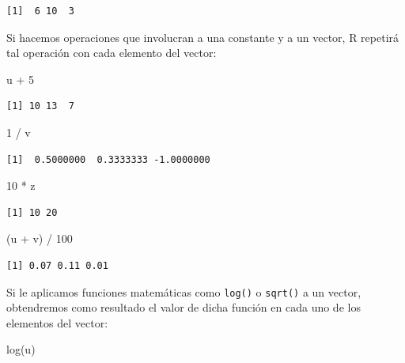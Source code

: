 \documentclass[
]{book}
\newenvironment{Shaded}{\begin{snugshade}}{\end{snugshade}}
\newcommand{\DecValTok}[1]{\textcolor[rgb]{0.00,0.00,0.81}{#1}}
\newcommand{\FunctionTok}[1]{\textcolor[rgb]{0.00,0.00,0.00}{#1}}
\newcommand{\NormalTok}[1]{#1}
\newcommand{\SpecialCharTok}[1]{\textcolor[rgb]{0.00,0.00,0.00}{#1}}
\begin{document}
\begin{verbatim}
[1]  6 10  3
\end{verbatim}

Si hacemos operaciones que involucran a una constante y a un vector, R repetirá tal operación con cada elemento del vector:

\begin{Shaded}
\begin{Highlighting}[]
\NormalTok{u }\SpecialCharTok{+} \DecValTok{5}
\end{Highlighting}
\end{Shaded}

\begin{verbatim}
[1] 10 13  7
\end{verbatim}

\begin{Shaded}
\begin{Highlighting}[]
\DecValTok{1} \SpecialCharTok{/}\NormalTok{ v}
\end{Highlighting}
\end{Shaded}

\begin{verbatim}
[1]  0.5000000  0.3333333 -1.0000000
\end{verbatim}

\begin{Shaded}
\begin{Highlighting}[]
\DecValTok{10} \SpecialCharTok{*}\NormalTok{ z}
\end{Highlighting}
\end{Shaded}

\begin{verbatim}
[1] 10 20
\end{verbatim}

\begin{Shaded}
\begin{Highlighting}[]
\NormalTok{(u }\SpecialCharTok{+}\NormalTok{ v) }\SpecialCharTok{/} \DecValTok{100}
\end{Highlighting}
\end{Shaded}

\begin{verbatim}
[1] 0.07 0.11 0.01
\end{verbatim}

Si le aplicamos funciones matemáticas como \texttt{log()} o \texttt{sqrt()} a un vector, obtendremos como resultado el valor de dicha función en cada uno de los elementos del vector:

\begin{Shaded}
\begin{Highlighting}[]
\FunctionTok{log}\NormalTok{(u)}
\end{Highlighting}
\end{Shaded}
\end{document}
